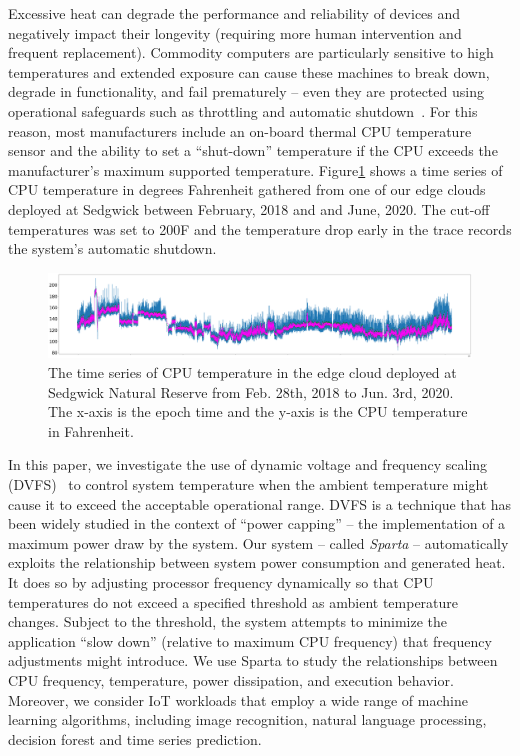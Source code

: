 Excessive heat can degrade the performance and reliability of devices and negatively impact their longevity (requiring more human intervention and frequent replacement). Commodity computers are particularly sensitive to high temperatures and extended exposure can cause these machines to break down, degrade in functionality, and fail prematurely -- even they are protected using operational safeguards such as throttling and automatic shutdown~\cite{ref:overheating}. For this reason, most manufacturers include an on-board thermal CPU temperature sensor and the ability to set a ``shut-down'' temperature if the CPU exceeds the manufacturer's maximum supported temperature. Figure\ref{fig:time_series} shows a time series of CPU temperature in degrees Fahrenheit gathered from one of our edge clouds deployed at Sedgwick between February, 2018 and and June, 2020. The cut-off temperatures was set to 200\degree F and the temperature drop early in the trace records the system's automatic shutdown.

\begin{figure}
\includegraphics[width=\textwidth]{figures/time_series.png}
\caption{The time series of CPU temperature in the edge cloud deployed at Sedgwick Natural Reserve from Feb. 28th, 2018 to Jun. 3rd, 2020. The x-axis is the epoch time and the y-axis is the CPU temperature in Fahrenheit. } \label{fig:time_series}
\end{figure}

In this paper, we investigate the use of dynamic voltage and frequency scaling (DVFS)~\cite{ref:Liu2007dvfs,ref:Wang2010dvfs,ref:Wu2013dvfs} to control system temperature when the ambient temperature might cause it to exceed the acceptable operational range. DVFS is a technique that has been widely studied in the context of ``power capping'' -- the implementation of a maximum power draw by the system.  Our system -- called \textit{Sparta} --  automatically exploits the relationship between system power consumption and generated heat.  It does so by adjusting processor frequency dynamically so that CPU temperatures do not exceed a specified threshold as ambient temperature changes.  Subject to the threshold, the system attempts to minimize the application ``slow down'' (relative to maximum CPU frequency) that frequency adjustments might introduce.  
We use Sparta to study the relationships between CPU frequency, temperature, power dissipation, and execution behavior. Moreover, we consider IoT workloads that employ a wide range of machine learning algorithms, including image recognition, natural language processing, decision forest and time series prediction. 

